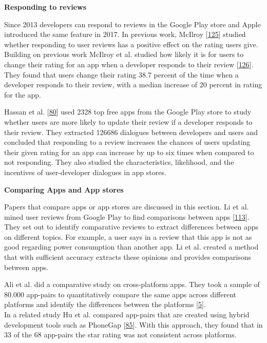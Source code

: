 \documentclass[]{book}
\begin{document}
\textbf{Responding to reviews}

Since 2013 developers can respond to reviews in the Google Play store
and Apple introduced the same feature in 2017. In previous work, McIlroy
{[}\protect\hyperlink{ref-mcilroy2014empirical}{125}{]} studied whether
responding to user reviews has a positive effect on the rating users
give. Building on previous work McIlroy et al. studied how likely it is
for users to change their rating for an app when a developer responds to
their review {[}\protect\hyperlink{ref-mcilroy2017worth}{126}{]}. They
found that users change their rating 38.7 percent of the time when a
developer responds to their review, with a median increase of 20 percent
in rating for the app.

Hassan et al. {[}\protect\hyperlink{ref-hassan2018studying}{80}{]} used
2328 top free apps from the Google Play store to study whether users are
more likely to update their review if a developer responds to their
review. They extracted 126686 dialogues between developers and users and
concluded that responding to a review increases the chances of users
updating their given rating for an app can increase by up to six times
when compared to not responding. They also studied the characteristics,
likelihood, and the incentives of user-developer dialogues in app
stores.

\textbf{Comparing Apps and App stores}

Papers that compare apps or app stores are discussed in this section. Li
et al. mined user reviews from Google Play to find comparisons between
apps {[}\protect\hyperlink{ref-li2017mining}{113}{]}. They set out to
identify comparative reviews to extract differences between apps on
different topics. For example, a user says in a review that this app is
not as good regarding power consumption than another app. Li et al.
created a method that with sufficient accuracy extracts these opinions
and provides comparisons between apps.

Ali et al. did a comparative study on cross-platform apps. They took a
sample of 80.000 app-pairs to quantitatively compare the same apps
across different platforms and identify the differences between the
platforms {[}\protect\hyperlink{ref-ali2017same}{5}{]}.\\
In a related study Hu et al. compared app-pairs that are created using
hybrid development tools such as PhoneGap
{[}\protect\hyperlink{ref-hu2018studying}{85}{]}. With this approach,
they found that in 33 of the 68 app-pairs the star rating was not
consistent across platforms.
\end{document}
